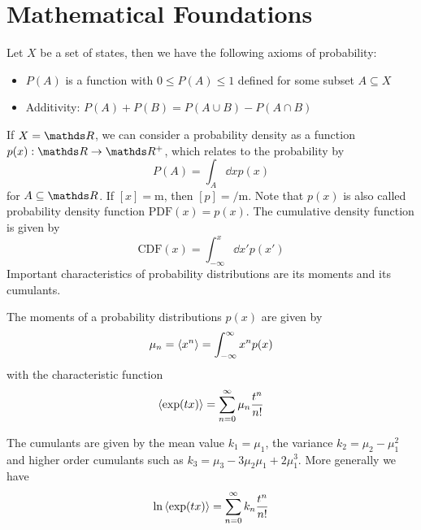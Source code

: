 \documentclass{/home/ben/Templates/notebook}
\begin{document}
	\section{Mathematical Foundations}
	
	\begin{theorem}
		Let $X$ be a set of states, then we have the following axioms of probability:
		\begin{itemize}
			\item{$P(A)$ is a function with $0 \leq P(A) \leq 1$ defined for some subset $A \subseteq X$}
			\item{Additivity: $P(A) + P(B) = P(A \cup B) - P(A \cap B)$}
		\end{itemize}
	\end{theorem}
	
	If $X = \R$, we can consider a probability density as a function $p(x) : \R \to \R^+$, which relates to the probability by
	\begin{equation}
	P(A) = \int_A{\dd{x} p(x)}
	\end{equation}
	for $A \subseteq \R$. If $[x] = \si{\meter}$, then $[p] = \si{\per \meter}$. Note that $p(x)$ is also called probability density function $\mathrm{PDF}(x) = p(x)$. The cumulative density function is given by
	\begin{equation}
	\mathrm{CDF}(x) = \int^x_{-\infty}{\dd{x'} p(x')}
	\end{equation}
	Important characteristics of probability distributions are its moments and its cumulants.
	
	\begin{theorem}[Moments]
		The moments of a probability distributions $p(x)$ are given by
		\begin{equation}
		\mu_n = \expval{x^n} = \int^{\infty}_{-\infty}{x^n p(x)}
		\end{equation}
		with the characteristic function
		\begin{equation}
		\expval{\exp(t x)} = \sum^{\infty}_{n = 0}{\mu_n \frac{t^n}{n!}}
		\end{equation}
	\end{theorem}
	
	\begin{theorem}[Cumulants]
		The cumulants are given by the mean value $k_1 = \mu_1$, the variance $k_2 = \mu_2 - \mu^2_1$ and higher order cumulants such as $ k_3 = \mu_3 - 3 \mu_2 \mu_1 + 2 \mu_1^3$. More generally we have
		\begin{equation}
		\ln \expval{\exp(t x)} = \sum^{\infty}_{n = 0}{k_n \frac{t^n}{n!}}
		\end{equation}
	\end{theorem}
	
\end{document}
